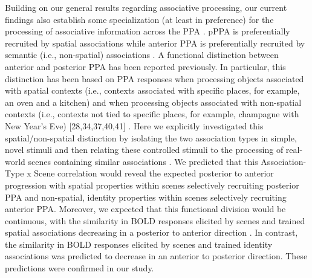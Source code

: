 \documentclass[english]{article}
\begin{document}
 Building on our general results regarding associative processing, our current
 findings also establish some specialization (at least in preference) for the
 processing of associative information across the PPA
 \citep{aminoff2015associative}.
%
pPPA is preferentially recruited by spatial associations while anterior PPA is
preferentially recruited by semantic (i.e., non-spatial) associations
\citep{aminoff2015associative}.
%
A functional distinction between anterior and posterior PPA has been reported
previously. In particular, this distinction has been based on PPA responses when
processing objects associated with spatial contexts (i.e., contexts associated
with specific places, for example, an oven and a kitchen) and when processing
objects associated with non-spatial contexts (i.e., contexts not tied to
specific places, for example, champagne with New Year’s Eve) [28,34,37,40,41]
\citep{aminoff2015associative}.
%
Here we explicitly investigated this spatial/non-spatial distinction by
isolating the two association types in simple, novel stimuli and then relating
these controlled stimuli to the processing of real-world scenes containing
similar associations \citep{aminoff2015associative}.
%
We predicted that this Association-Type x Scene correlation would reveal the
expected posterior to anterior progression with spatial properties within scenes
selectively recruiting posterior PPA and non-spatial, identity properties within
scenes selectively recruiting anterior PPA\citep{aminoff2015associative}.
%
Moreover, we expected that this functional division would be continuous, with
the similarity in BOLD responses elicited by scenes and trained spatial
associations decreasing in a posterior to anterior direction
\citep{aminoff2015associative}.
%
In contrast, the similarity in BOLD responses elicited by scenes and trained
identity associations was predicted to decrease in an anterior to posterior
direction.  These predictions were confirmed in our
study\citep{aminoff2015associative}.
\end{document}
